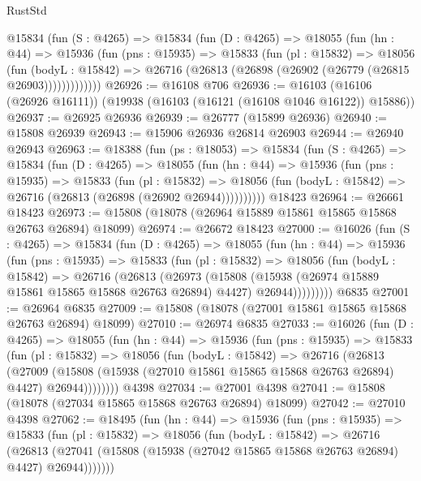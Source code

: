\begin{lexlean}{RustStd}
\begin{coremodule}
      @15834
        (fun (S : @4265) =>
        @15834
          (fun (D : @4265) =>
          @18055
            (fun (hn : @44) =>
            @15936
              (fun (pns : @15935) =>
              @15833
                (fun (pl : @15832) =>
                @18056
                  (fun (bodyL : @15842) =>
                  @26716 (@26813 (@26898 (@26902 (@26779 (@26815 @26903)))))))))))))
@26926 := @16108 @706
@26936 := @16103 (@16106 (@26926 @16111)) (@19938 (@16103 (@16121 (@16108 @1046 @16122)) @15886))
@26937 := @26925 @26936
@26939 := @26777 (@15899 @26936)
@26940 := @15808 @26939
@26943 := @15906 @26936 @26814 @26903
@26944 := @26940 @26943
@26963 := @18388
    (fun (ps : @18053) =>
    @15834
      (fun (S : @4265) =>
      @15834
        (fun (D : @4265) =>
        @18055
          (fun (hn : @44) =>
          @15936
            (fun (pns : @15935) =>
            @15833
              (fun (pl : @15832) =>
              @18056 (fun (bodyL : @15842) => @26716 (@26813 (@26898 (@26902 @26944))))))))))
    @18423
@26964 := @26661 @18423
@26973 := @15808 (@18078 (@26964 @15889 @15861 @15865 @15868 @26763 @26894) @18099)
@26974 := @26672 @18423
@27000 := @16026
    (fun (S : @4265) =>
    @15834
      (fun (D : @4265) =>
      @18055
        (fun (hn : @44) =>
        @15936
          (fun (pns : @15935) =>
          @15833
            (fun (pl : @15832) =>
            @18056
              (fun (bodyL : @15842) =>
              @26716
                (@26813
                  (@26973
                    (@15808
                      (@15938 (@26974 @15889 @15861 @15865 @15868 @26763 @26894) @4427)
                      @26944)))))))))
    @6835
@27001 := @26964 @6835
@27009 := @15808 (@18078 (@27001 @15861 @15865 @15868 @26763 @26894) @18099)
@27010 := @26974 @6835
@27033 := @16026
    (fun (D : @4265) =>
    @18055
      (fun (hn : @44) =>
      @15936
        (fun (pns : @15935) =>
        @15833
          (fun (pl : @15832) =>
          @18056
            (fun (bodyL : @15842) =>
            @26716
              (@26813
                (@27009
                  (@15808 (@15938 (@27010 @15861 @15865 @15868 @26763 @26894) @4427) @26944))))))))
    @4398
@27034 := @27001 @4398
@27041 := @15808 (@18078 (@27034 @15865 @15868 @26763 @26894) @18099)
@27042 := @27010 @4398
@27062 := @18495
    (fun (hn : @44) =>
    @15936
      (fun (pns : @15935) =>
      @15833
        (fun (pl : @15832) =>
        @18056
          (fun (bodyL : @15842) =>
          @26716
            (@26813
              (@27041 (@15808 (@15938 (@27042 @15865 @15868 @26763 @26894) @4427) @26944)))))))

\end{coremodule}
\end{lexlean}
